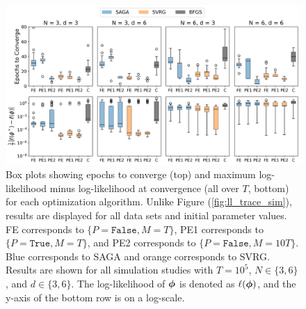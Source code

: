 %
\begin{figure}[h]
    \centering
    \includegraphics[width=5.5in]{../plt/boxplots_sim_T_100000.png}
    \caption{Box plots showing epochs to converge (top) and maximum log-likelihood minus log-likelihood at convergence (all over $T$, bottom) for each optimization algorithm. Unlike Figure (\ref{fig:ll_trace_sim}), results are displayed for all data sets and initial parameter values. FE corresponds to $\{P = \texttt{False}, M = T\}$, PE1 corresponds to $\{P = \texttt{True}, M = T\}$, and PE2 corresponds to $\{P = \texttt{False}, M = 10T\}$. Blue corresponds to SAGA and orange corresponds to SVRG. Results are shown for all simulation studies with $T=10^{5}$, $N \in \{3,6\}$, and $d \in \{3,6\}$.
    The log-likelihood of $\boldsymbol{\phi}$ is denoted as $\ell(\boldsymbol{\phi})$, and the y-axis of the bottom row is on a log-scale.}
    \label{fig:boxplots_sim}
\end{figure}
%
